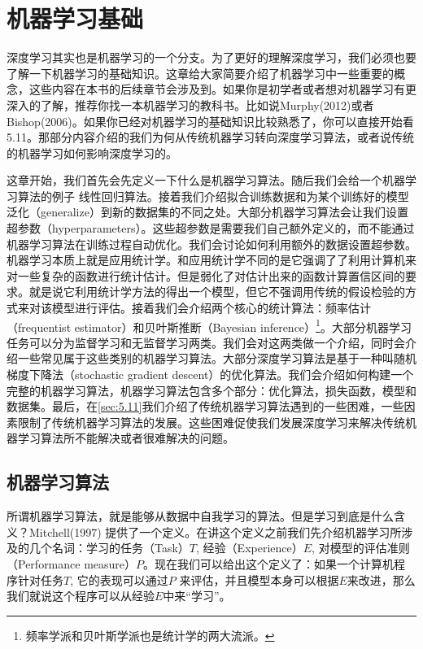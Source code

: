 \chapter{机器学习基础}
\label{chap:5}

深度学习其实也是机器学习的一个分支。为了更好的理解深度学习，我们必须也要了解一下机器学习的基础知识。这章给大家简要介绍了机器学习中一些重要的概念，这些内容在本书的后续章节会涉及到。如果你是初学者或者想对机器学习有更深入的了解，推荐你找一本机器学习的教科书。比如说Murphy(2012)或者Bishop(2006)。如果你已经对机器学习的基础知识比较熟悉了，你可以直接开始看5.11。那部分内容介绍的我们为何从传统机器学习转向深度学习算法，或者说传统的机器学习如何影响深度学习的。

这章开始，我们首先会先定义一下什么是机器学习算法。随后我们会给一个机器学习算法的例子 线性回归算法。接着我们介绍拟合训练数据和为某个训练好的模型泛化（generalize）到新的数据集的不同之处。大部分机器学习算法会让我们设置超参数（hyperparameters）。这些超参数是需要我们自己额外定义的，而不能通过机器学习算法在训练过程自动优化。我们会讨论如何利用额外的数据设置超参数。机器学习本质上就是应用统计学。和应用统计学不同的是它强调了了利用计算机来对一些复杂的函数进行统计估计。但是弱化了对估计出来的函数计算置信区间的要求。就是说它利用统计学方法的得出一个模型，但它不强调用传统的假设检验的方式来对该模型进行评估。接着我们会介绍两个核心的统计算法：频率估计（frequentist estimator）和贝叶斯推断（Bayesian inference）\footnote{频率学派和贝叶斯学派也是统计学的两大流派。}。大部分机器学习任务可以分为监督学习和无监督学习两类。我们会对这两类做一个介绍，同时会介绍一些常见属于这些类别的机器学习算法。大部分深度学习算法是基于一种叫随机梯度下降法（stochastic gradient descent）的优化算法。我们会介绍如何构建一个完整的机器学习算法，机器学习算法包含多个部分：优化算法，损失函数，模型和数据集。最后，在\ref{sec:5.11}我们介绍了传统机器学习算法遇到的一些困难，一些因素限制了传统机器学习算法的发展。这些困难促使我们发展深度学习来解决传统机器学习算法所不能解决或者很难解决的问题。

\section{机器学习算法}
\label{sec:5.1}

所谓机器学习算法，就是能够从数据中自我学习的算法。但是学习到底是什么含义？Mitchell(1997) 提供了一个定义。在讲这个定义之前我们先介绍机器学习所涉及的几个名词：学习的任务（Task）$T$, 经验（Experience）$E$, 对模型的评估准则（Performance measure）$P$。现在我们可以给出这个定义了：如果一个计算机程序针对任务$T$, 它的表现可以通过$P$ 来评估，并且模型本身可以根据$E$来改进，那么我们就说这个程序可以从经验$E$中来“学习”。


